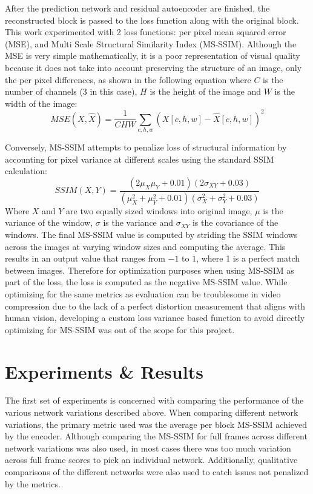 \documentclass[10pt,twocolumn,letterpaper]{article}
\begin{document}
After the prediction network and residual autoencoder are finished, the reconstructed block is passed to the loss function along with the original block. This work experimented with 2 loss functions: per pixel mean squared error (MSE), and Multi Scale Structural Similarity Index (MS-SSIM)\cite{wang2003multiscale}. Although the MSE is very simple mathematically, it is a poor representation of visual quality because it does not take into account preserving the structure of an image, only the per pixel differences, as shown in the following equation where $C$ is the number of channels (3 in this case), $H$ is the height of the image and $W$ is the width of the image:
\[
  MSE(X, \hat{X}) = \frac{1}{CHW} \sum_{c, h, w}\left(X[c, h, w] - \hat{X}[c, h, w]\right)^2
\]

Conversely, MS-SSIM attempts to penalize loss of structural information by accounting for pixel variance at different scales using the standard SSIM calculation:
\[
  SSIM(X, Y) = \frac{(2\mu_X\mu_Y + 0.01)(2\sigma_{XY} + 0.03)}{(\mu_X^2 + \mu_Y^2 + 0.01)(\sigma_X^2 + \sigma_Y^2 + 0.03)}
\]
Where $X$ and $Y$ are two equally sized windows into original image, $\mu$ is the variance of the window, $\sigma$ is the variance and $\sigma_{XY}$ is the covariance of the windows. The final MS-SSIM value is computed by striding the SSIM windows across the images at varying window sizes and computing the average. This results in an output value that ranges from $-1$ to $1$, where 1 is a perfect match between images. Therefore for optimization purposes when using MS-SSIM as part of the loss, the loss is computed as the negative MS-SSIM value. While optimizing for the same metrics as evaluation can be troublesome in video compression due to the lack of a perfect distortion measurement that aligns with human vision, developing a custom loss variance based function to avoid directly optimizing for MS-SSIM was out of the scope for this project.

\section{Experiments \& Results}
The first set of experiments is concerned with comparing the performance of the various network variations described above. When comparing different network variations, the primary metric used was the average per block MS-SSIM achieved by the encoder. Although comparing the MS-SSIM for full frames across different network variations was also used, in most cases there was too much variation across full frame scores to pick an individual network. Additionally, qualitative comparisons of the different networks were also used to catch issues not penalized by the metrics.
\end{document}
